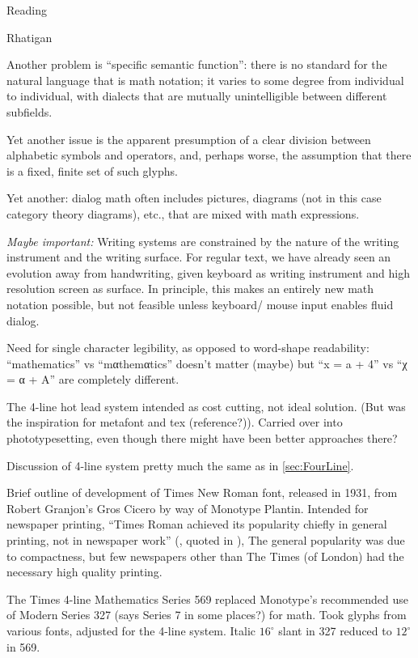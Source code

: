 \documentclass[11pt]{PalisadesLakesBook}
\begin{document}
\begin{plSection}{Reading}
\begin{plSection}{Rhatigan}
\begin{plSection}{}
Another problem is ``specific semantic function'': 
there is no standard for the natural language that is 
math notation; 
it varies to some degree from individual to individual,
with dialects that are mutually unintelligible 
between different subfields.

Yet another issue is the apparent presumption of a clear division
between alphabetic symbols and operators, and, perhaps worse,
the assumption that there is a fixed, finite set of such glyphs.

Yet another: dialog math often includes pictures, diagrams 
(not in this case category theory diagrams), etc.,
that are mixed with math expressions.

\emph{Maybe important:} 
Writing systems are constrained by the nature of the writing
instrument and the writing surface.
For regular text, we have already seen an evolution away from
handwriting, given keyboard as writing instrument
and high resolution screen as surface.
In principle, this makes an entirely new math notation possible,
but not feasible unless keyboard/ mouse input enables
fluid dialog. 

Need for single character legibility, as opposed to word-shape
readability:
``mathematics'' vs ``mαthemαtics'' doesn't matter (maybe)
but ``x = a + 4'' vs ``χ = α + A'' are completely different.

\begin{plSection}{}

The 4-line hot lead system intended as cost cutting, 
not ideal solution.
(But was the inspiration for metafont and tex (reference?)).
Carried over into phototypesetting, 
even though there might have been better approaches there?

Discussion of 4-line system pretty much the same as in 
\cref{sec:FourLine}.

Brief outline of development of Times New Roman font,
released in 1931,
from Robert Granjon's Gros Cicero by way of Monotype Plantin.
Intended for newspaper printing,
``Times Roman achieved its popularity chiefly in general printing, 
not in newspaper work'' 
(,
quoted in \cite{wiki:TimesNewRoman}),
The general popularity was due to compactness,
but few newspapers other than The Times
(of London) had the necessary high quality printing.

The Times 4-line Mathematics Series 569 
replaced Monotype's recommended use of Modern Series 327 
(says Series 7 in some places?) for math.
Took glyphs from various fonts, adjusted for the 4-line system.
Italic $16^{\circ}$ slant in 327 reduced to $12^{\circ}$ in 569.


\end{plSection}
\end{plSection}
\end{plSection}
\end{plSection}
\end{document}
